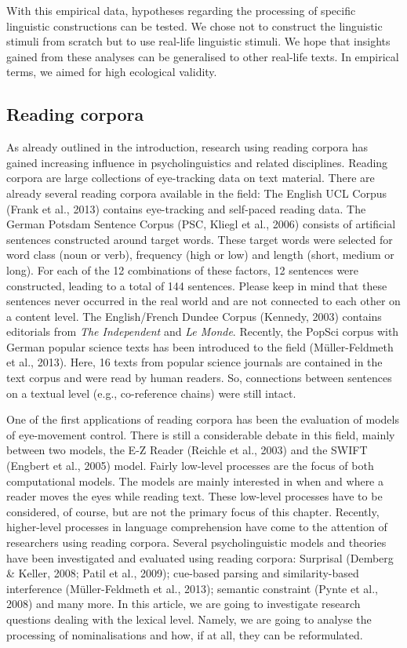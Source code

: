 \documentclass[output=paper]{langsci/langscibook}
\begin{document}
With this empirical data, hypotheses regarding the processing of specific linguistic constructions can be tested. We chose not to construct the linguistic stimuli from scratch but to use real-life linguistic stimuli. We hope that insights gained from these analyses can be generalised to other real-life texts. In empirical terms, we aimed for high ecological validity. 

\subsection{\label{bkm:Ref283725832}Reading corpora}

As already outlined in the introduction, research using reading corpora has gained increasing influence in psycholinguistics and related disciplines. Reading corpora are large collections of eye-tracking data on text material. There are already several reading corpora available in the field: The English UCL Corpus (Frank et al., 2013) contains eye-tracking and self-paced reading data. The German Potsdam Sentence Corpus (PSC, Kliegl et al., 2006) consists of artificial sentences constructed around target words. These target words were selected for word class (noun or verb), frequency (high or low) and length (short, medium or long). For each of the 12 combinations of these factors, 12 sentences were constructed, leading to a total of 144 sentences. Please keep in mind that these sentences never occurred in the real world and are not connected to each other on a content level. The English/French Dundee Corpus (Kennedy, 2003) contains editorials from \textit{The Independent }and \textit{Le Monde}. Recently, the PopSci corpus with German popular science texts has been introduced to the field (Müller-Feldmeth et al., 2013). Here, 16 texts from popular science journals are contained in the text corpus and were read by human readers. So, connections between sentences on a textual level (e.g., co-reference chains) were still intact.

One of the first applications of reading corpora has been the evaluation of models of eye-movement control. There is still a considerable debate in this field, mainly between two models, the E-Z Reader (Reichle et al., 2003) and the SWIFT (Engbert et al., 2005) model. Fairly low-level processes are the focus of both computational models. The models are mainly interested in when and where a reader moves the eyes while reading text. These low-level processes have to be considered, of course, but are not the primary focus of this chapter. Recently, higher-level processes in language comprehension have come to the attention of researchers using reading corpora. Several psycholinguistic models and theories have been investigated and evaluated using reading corpora: Surprisal (Demberg \& Keller, 2008; Patil et al., 2009); cue-based parsing and similarity-based interference (Müller-Feldmeth et al., 2013); semantic constraint (Pynte et al., 2008) and many more. In this article, we are going to investigate research questions dealing with the lexical level. Namely, we are going to analyse the processing of nominalisations and how, if at all, they can be reformulated.
\end{document}
